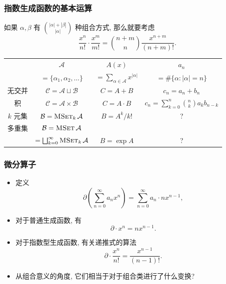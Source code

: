 \documentclass{ctexbeamer}
\DeclareMathOperator{\MSet}{\textsc{MSet}}
\begin{document}
\begin{frame}
  \frametitle{指数生成函数的基本运算}

  如果 $\alpha, \beta$ 有 $\binom{|\alpha| + |\beta|}{|\alpha|}$ 种组合方式, 那么就要考虑
  \begin{equation}
    \frac{x^n}{n!} \cdot \frac{x^m}{m!} = \binom{n+m}{n} \frac{x^{n+m}}{(n+m)!}.
  \end{equation}

  \begin{table}[htbp]
    \centering
    \begin{tabular}{cccc}
        \toprule
          & \huge $\mathcal A$ & \huge $A(x)$ & \huge $a_n$ \\
          & $ = \{ \alpha_1,\alpha_2,\dots \}$ & $\displaystyle = \sum_{\alpha\in \mathcal A} x^{|\alpha|}$ & $\displaystyle = \# \{\alpha : |\alpha| = n\}$ \\
        \midrule
          无交并 & $\mathcal C = \mathcal A \sqcup \mathcal B$ & $C = A+B$ & $c_n=a_n+b_n$ \\
        \midrule
          积 & $\mathcal C = \mathcal A \times \mathcal B$ & $C = A\cdot B$ & $c_n=\sum_{k=0}^n \binom{n}{k} a_k b_{n-k}$ \\
        \midrule
          $k$ 元集 & $\mathcal B = \MSet_k \mathcal A$ & $B = A^k / k!$ & ? \\
        \midrule
          多重集 & $\mathcal B = \MSet \mathcal A$ &  &  \\
                & $= \bigsqcup_{k=0}^\infty \MSet_k \mathcal A$ & $B = \exp A$ & ? \\
        \bottomrule
    \end{tabular}
  \end{table}

\end{frame}

\begin{frame}
  \frametitle{微分算子}

  \begin{itemize}
    \item 定义
    \begin{equation}
      \partial \left( \sum_{n=0}^\infty a_n x^n \right) =  \sum_{n=0}^\infty a_n \cdot n x^{n-1},
    \end{equation}
    \item 对于普通生成函数, 有
    \begin{equation}
      \partial \cdot x^n = n x^{n-1}.
    \end{equation}
    \item 对于指数型生成函数, 有关递推式的算法
    \begin{equation}
      \partial \cdot \frac{x^n}{n!} = \frac{x^{n-1}}{(n-1)!}.
    \end{equation}
    \item 从组合意义的角度, 它们相当于对于组合类进行了什么变换?
  \end{itemize}

\end{frame}
\end{document}
